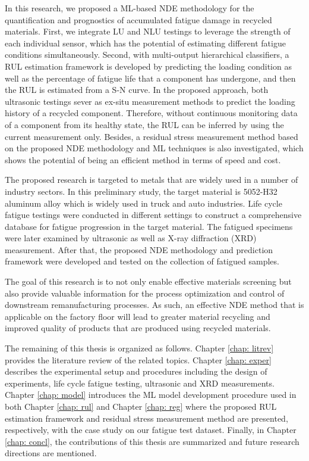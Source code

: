 In this research, we proposed a ML-based NDE methodology for the quantification and prognostics of accumulated fatigue damage in recycled materials. First, we integrate LU and NLU testings to leverage the strength of each individual sensor, which has the potential of estimating different fatigue conditions simultaneously. Second, with multi-output hierarchical classifiers, a RUL estimation framework is developed by predicting the loading condition as well as the percentage of fatigue life that a component has undergone, and then the RUL is estimated from a S-N curve. In the proposed approach, both ultrasonic testings sever as ex-situ measurement methods to predict the loading history of a recycled component. Therefore, without continuous monitoring data of a component from its healthy state, the RUL can be inferred by using the current measurement only. Besides, a residual stress measurement method based on the proposed NDE methodology and ML techniques is also investigated, which shows the potential of being an efficient method in terms of speed and cost.

The proposed research is targeted to metals that are widely used in a number of industry sectors. In this preliminary study, the target material is 5052-H32 aluminum alloy which is widely used in truck and auto industries. Life cycle fatigue testings were conducted in different settings to construct a comprehensive database for fatigue progression in the target material. The fatigued specimens were later examined by ultrasonic as well as X-ray diffraction (XRD) measurement. After that, the proposed NDE methodology and prediction framework were developed and tested on the collection of fatigued samples.

The goal of this research is to not only enable effective materials screening but also provide valuable information for the process optimization and control of downstream remanufacturing processes. As such, an effective NDE method that is applicable on the factory floor will lead to greater material recycling and improved quality of products that are produced using recycled materials.

The remaining of this thesis is organized as follows. Chapter \ref{chap: litrev} provides the literature review of the related topics. Chapter \ref{chap: exper} describes the experimental setup and procedures including the design of experiments, life cycle fatigue testing, ultrasonic and XRD measurements. Chapter \ref{chap: model} introduces the ML model development procedure used in both Chapter \ref{chap: rul} and Chapter \ref{chap: reg} where the proposed RUL estimation framework and residual stress measurement method are presented, respectively, with the case study on our fatigue test dataset. Finally, in Chapter \ref{chap: concl}, the contributions of this thesis are summarized and future research directions are mentioned.

